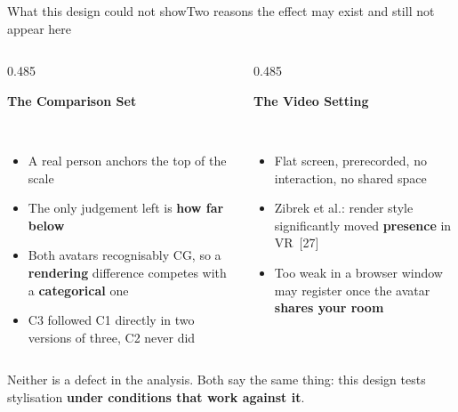 \documentclass[aspectratio=169,10pt]{beamer}
\newcommand{\hl}[1]{{\color{knblue}\textbf{#1}}}
\newcommand{\panelhead}[1]{\noindent\colorbox{kncyan}{\parbox{0.96\textwidth}{\centering\vspace{1pt}\color{white}\scriptsize\bfseries #1\vspace{1pt}}}\\[0.25em]}
\newcommand{\panel}[1]{\noindent\colorbox{knlight}{\parbox{0.96\textwidth}{\vspace{2pt}\scriptsize
\begin{itemize}\setlength{\itemsep}{0.2em}\setlength{\leftmargini}{1.1em}#1\end{itemize}\vspace{2pt}}}}
\begin{document}
\begin{frame}{What this design could not show}{Two reasons the effect may exist and still not appear here}
  \vspace{0.6em}
  \begin{columns}[T]
    \begin{column}{0.485\textwidth}
      \panelhead{The Comparison Set}
      \panel{%
        \item A real person anchors the top of the scale
        \item The only judgement left is \hl{how far below}
        \item Both avatars recognisably CG, so a \hl{rendering} difference competes with a \hl{categorical} one
        \item C3 followed C1 directly in two versions of three, C2 never did}
    \end{column}
    \begin{column}{0.485\textwidth}
      \panelhead{The Video Setting}
      \panel{%
        \item Flat screen, prerecorded, no interaction, no shared space
        \item Zibrek et al.: render style significantly moved \hl{presence} in VR~[27]
        \item Too weak in a browser window may register once the avatar \hl{shares your room}}
    \end{column}
  \end{columns}
  \vfill
  \noindent\colorbox{knlight}{\parbox{0.975\textwidth}{\scriptsize\color{knblue}
  Neither is a defect in the analysis. Both say the same thing: this design tests stylisation \textbf{under conditions that work against it}.}}
\end{frame}
\end{document}

